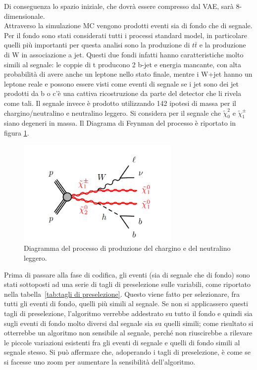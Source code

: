 Di conseguenza lo spazio iniziale, che dovrà essere compresso dal VAE, sarà 8-dimensionale. \\
Attraverso la simulazione MC vengono prodotti eventi sia di fondo che di segnale. Per il fondo sono stati considerati tutti i processi standard model, in particolare quelli più importanti per questa analisi sono la produzione di $t\bar{t}$ e la produzione di W in associazione a jet. Questi due fondi infatti hanno caratteristiche molto simili al segnale: le coppie di t producono 2 b-jet e energia mancante, con alta probabilità di avere anche un leptone nello stato finale, mentre i W+jet hanno un leptone reale e possono essere visti come eventi di segnale se i jet sono dei jet prodotti da b o c'è una cattiva ricostruzione da parte del detector che li rivela come tali. Il segnale invece è prodotto utilizzando 142 ipotesi di massa per il chargino/neutralino e neutralino leggero. Si considera per il segnale che $\tilde{\chi}^2_0$ e $\tilde{\chi}_1^\pm$ siano degeneri in massa. Il Diagrama di Feynman del processo è riportato in figura \ref{diagrammaF}.
\begin{figure}[h!]
	\centering
	\includegraphics[width=0.70\textwidth]{figs/diagrammaF.png}
	\caption{Diagramma del processo di produzione del chargino e del neutralino leggero.}
	\label{diagrammaF}
\end{figure}

Prima di passare alla fase di codifica, gli eventi (sia di segnale che di fondo) sono stati sottoposti ad una serie di tagli di preselezione sulle variabili, come riportato nella tabella~\ref{tab:tagli di preselezione}. Questo viene fatto per selezionare, fra tutti gli eventi di fondo, quelli più simili al segnale. Se non si applicassero questi tagli di preselezione, l'algoritmo verrebbe addestrato su tutto il fondo e quindi sia sugli eventi di fondo molto diversi dal segnale sia su quelli simili; come risultato si otterrebbe un algoritmo non sensibile al segnale, perché non riuscirebbe a rilevare le piccole variazioni esistenti fra gli eventi di segnale e quelli di fondo simili al segnale stesso. Si può affermare che, adoperando i tagli di preselezione, è come se si facesse uno zoom per aumentare la sensibilità dell'algoritmo. 


